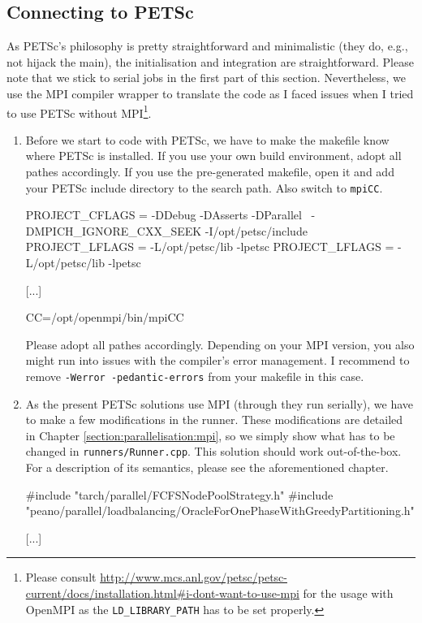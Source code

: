 \subsection{Connecting to PETSc}

As PETSc's philosophy is pretty straightforward and minimalistic (they do, e.g.,
not hijack the main), the initialisation and integration are straightforward.
Please note that we stick to serial jobs in the first part of this section.
Nevertheless, we use the MPI compiler wrapper to translate the code as I faced
issues when I tried to use PETSc without MPI\footnote{Please consult
\url{http://www.mcs.anl.gov/petsc/petsc-current/docs/installation.html#i-dont-want-to-use-mpi}
for the usage with OpenMPI as the \texttt{LD\_LIBRARY\_PATH} has to be set
properly.}.


\begin{enumerate}
  \item Before we start to code with PETSc, we have to make the makefile know
  where PETSc is installed. If you use your own build environment, adopt all
  pathes accordingly. If you use the pre-generated makefile, open it and add
  your PETSc include directory to the search path. Also switch to
  \texttt{mpiCC}.
  \begin{code}
    PROJECT_CFLAGS = -DDebug -DAsserts -DParallel \
      -DMPICH_IGNORE_CXX_SEEK -I/opt/petsc/include 
    PROJECT_LFLAGS = -L/opt/petsc/lib -lpetsc 
    PROJECT_LFLAGS = -L/opt/petsc/lib -lpetsc

    [...]

    CC=/opt/openmpi/bin/mpiCC
  \end{code}
  Please adopt all pathes accordingly. Depending on your MPI version, you also
  might run into issues with the compiler's error management. I recommend to
  remove \texttt{-Werror -pedantic-errors} from your makefile in this case.
  \item As the present PETSc solutions use MPI (through they run serially), we
  have to make a few modifications in the runner. These modifications are
  detailed in Chapter \ref{section:parallelisation:mpi}, so we simply show
  what has to be changed in \texttt{runners/Runner.cpp}. This solution should
  work out-of-the-box.
  For a description of its semantics, please see the aforementioned chapter.
  \begin{code}
#include "tarch/parallel/FCFSNodePoolStrategy.h"
#include "peano/parallel/loadbalancing/OracleForOnePhaseWithGreedyPartitioning.h"

[...]


\end{code}
\end{enumerate}
